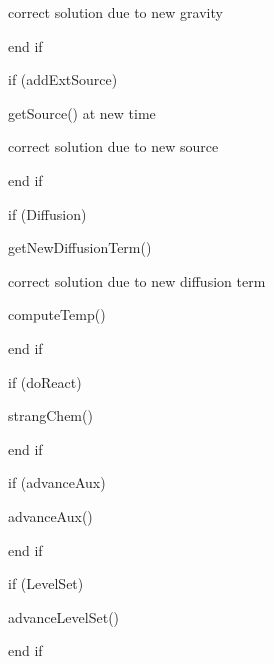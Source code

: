 \hspace{.1in}  correct solution due to new gravity

end if

if (addExtSource)

\hspace{.1in}  getSource() at new time

\hspace{.1in}  correct solution due to new source

end if

if (Diffusion)

\hspace{.1in}  getNewDiffusionTerm()

\hspace{.1in}  correct solution due to new diffusion term

\hspace{.1in}  computeTemp()

end if

if (doReact)

\hspace{.1in}  strangChem()

end if

if (advanceAux)

\hspace{.1in}  advanceAux()

end if

if (LevelSet)

\hspace{.1in}  advanceLevelSet()

end if

